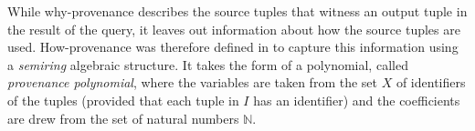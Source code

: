 While why-provenance describes the source tuples that witness an output tuple in the result of the query, it leaves out  information about how the source tuples are used.
How-provenance was therefore defined in \citep{howProvenanceGreen} to capture this information using a \emph{semiring} algebraic structure.
It takes the form of a polynomial, called \emph{provenance polynomial}, where the variables are taken from the set $X$ of identifiers of the tuples (provided that each tuple in $I$ has an identifier) and the coefficients are drew from the set of natural numbers $\mathbb{N}$. 

